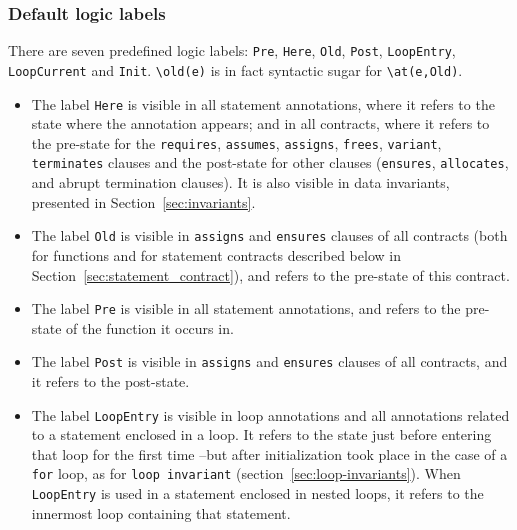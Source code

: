 \subsubsection*{Default logic labels}\label{sec:default-logic-labels}
There are seven predefined logic labels: \lstinline|Pre|, \lstinline|Here|,
\lstinline|Old|,
\lstinline|Post|, \lstinline|LoopEntry|, \lstinline|LoopCurrent|
and \lstinline|Init|.
\lstinline|\old(e)| is
in fact syntactic sugar for \lstinline|\at(e,Old)|.

\begin{itemize}

\item The label \lstinline|Here| is visible in all statement annotations,
  where it refers to the state where the annotation appears; and in
  all contracts, where it refers to the pre-state for the
  \lstinline|requires|, \lstinline|assumes|, \lstinline|assigns|,
  \lstinline|frees|,
  \lstinline|variant|,
  \lstinline|terminates|
  clauses and the post-state for other clauses
  (\lstinline|ensures|, \lstinline|allocates|, and abrupt termination
  clauses).
It is also visible in data invariants, presented in Section~\ref{sec:invariants}.
\item The label \lstinline|Old| is visible in \lstinline|assigns| and
  \lstinline|ensures| clauses of all contracts (both for functions and for
  statement contracts described below in
  Section~\ref{sec:statement_contract}), and refers to the pre-state
  of this contract.
\item The label \lstinline|Pre| is visible in all statement annotations,
  and refers to the pre-state of the function it occurs in.
\item The label \lstinline|Post| is visible in
\lstinline|assigns| and \lstinline|ensures| clauses of all contracts,
and it refers to the post-state.

\item The label \lstinline|LoopEntry|
is visible in loop annotations and
all annotations related to a statement enclosed in a loop.
It refers to the state just before entering that loop
for the first time --but after initialization took place in the case of a 
\lstinline|for| loop, as for \lstinline|loop invariant| 
(section~\ref{sec:loop-invariants}). When \lstinline|LoopEntry| is used in a 
statement enclosed in nested loops, it
refers to the innermost loop containing that statement.


\end{itemize}
